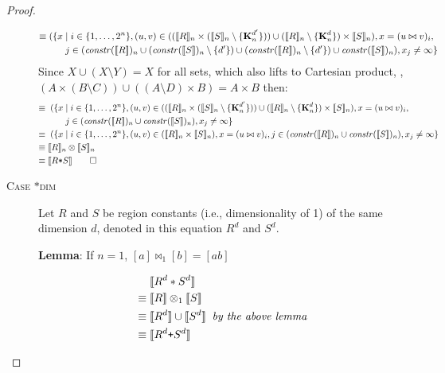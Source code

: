 \begin{proof}
\begin{description}
\begin{align*}
\equiv & \; (\{x \mid i \in \{1, \ldots, 2^n\},
                   (u, v) \in ((\interp{R}_n \times (\interp{S}_n \setminus
         \{\zeroEntry{d'}{n}\})) \cup (\interp{R}_n \setminus
         \{\zeroEntry{d}{n}\}) \times \interp{S}_n),
                   x = (u \bowtie v)_i, \\
 & \qquad         j \in (\effdims{\interp{R}}{n} \cup
         (\effdims{\interp{S}}{n} \setminus \{d'\}) \cup (\effdims{\interp{R}}{n} \setminus
         \{d'\}) \cup \effdims{\interp{S}}{n}),
                   x_j \neq \infty
                  \}
\end{align*}
%
Since $X \cup (X \setminus Y) = X$ for all sets, which also lifts to
Cartesian product, \ie{}, $(A \times (B \setminus C)) \cup ((A \setminus
D) \times B) = A \times B$ then:
%
\begin{align*}
\equiv \; & \; (\{x \mid i \in \{1, \ldots, 2^n\},
                   (u, v) \in ((\interp{R}_n \times (\interp{S}_n \setminus
         \{\zeroEntry{d'}{n}\})) \cup (\interp{R}_n \setminus
         \{\zeroEntry{d}{n}\}) \times \interp{S}_n),
                   x = (u \bowtie v)_i, \\
 & \qquad         j \in (\effdims{\interp{R}}{n} \cup \effdims{\interp{S}}{n}),
                   x_j \neq \infty
                  \} \\
\equiv \; & \; (\{x \mid i \in \{1, \ldots, 2^n\},
                   (u, v) \in (\interp{R}_n \times \interp{S}_n),
                   x = (u \bowtie v)_i, j \in (\effdims{\interp{R}}{n} \cup \effdims{\interp{S}}{n}),
                   x_j \neq \infty
                  \} \\
\equiv \; & \interp{R}_n \otimes \interp{S}_n \\
\equiv \; & \interp{R \term{*} S} \qed
\end{align*}

\item[\textsc{Case $*$dim}]

Let $R$ and $S$ be region constants (i.e., dimensionality
of 1) of the same dimension $d$, denoted in this equation $R^d$ and $S^d$.

\textbf{Lemma}: If $n=1$, $[a] \bowtie_1 [b] = [a b]$

\begin{align*}
 & \interp{R^d \ast S^d} \\
\equiv \; & \interp{R} \otimes_1 \interp{S} \\
\equiv \; & \interp{R^d} \cup \interp{S^d} \;\; \textit{by the above lemma} \\
\equiv \; & \interp{R^d \term{+} S^d}
\end{align*}


\end{description}
\end{proof}
